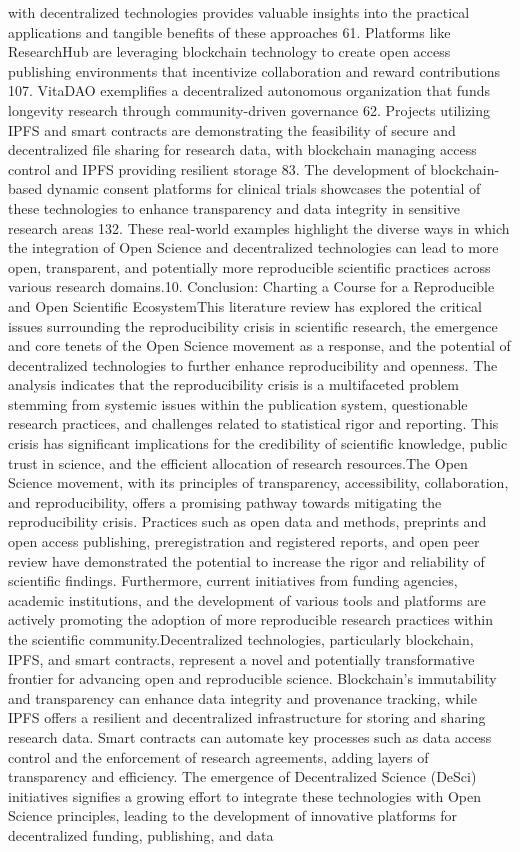 \documentclass{article}
\begin{document}
with decentralized technologies provides valuable insights into the practical applications and tangible benefits of these approaches 61. Platforms like ResearchHub are leveraging blockchain technology to create open access publishing environments that incentivize collaboration and reward contributions 107. VitaDAO exemplifies a decentralized autonomous organization that funds longevity research through community-driven governance 62. Projects utilizing IPFS and smart contracts are demonstrating the feasibility of secure and decentralized file sharing for research data, with blockchain managing access control and IPFS providing resilient storage 83. The development of blockchain-based dynamic consent platforms for clinical trials showcases the potential of these technologies to enhance transparency and data integrity in sensitive research areas 132. These real-world examples highlight the diverse ways in which the integration of Open Science and decentralized technologies can lead to more open, transparent, and potentially more reproducible scientific practices across various research domains.10. Conclusion: Charting a Course for a Reproducible and Open Scientific EcosystemThis literature review has explored the critical issues surrounding the reproducibility crisis in scientific research, the emergence and core tenets of the Open Science movement as a response, and the potential of decentralized technologies to further enhance reproducibility and openness. The analysis indicates that the reproducibility crisis is a multifaceted problem stemming from systemic issues within the publication system, questionable research practices, and challenges related to statistical rigor and reporting. This crisis has significant implications for the credibility of scientific knowledge, public trust in science, and the efficient allocation of research resources.The Open Science movement, with its principles of transparency, accessibility, collaboration, and reproducibility, offers a promising pathway towards mitigating the reproducibility crisis. Practices such as open data and methods, preprints and open access publishing, preregistration and registered reports, and open peer review have demonstrated the potential to increase the rigor and reliability of scientific findings. Furthermore, current initiatives from funding agencies, academic institutions, and the development of various tools and platforms are actively promoting the adoption of more reproducible research practices within the scientific community.Decentralized technologies, particularly blockchain, IPFS, and smart contracts, represent a novel and potentially transformative frontier for advancing open and reproducible science. Blockchain's immutability and transparency can enhance data integrity and provenance tracking, while IPFS offers a resilient and decentralized infrastructure for storing and sharing research data. Smart contracts can automate key processes such as data access control and the enforcement of research agreements, adding layers of transparency and efficiency. The emergence of Decentralized Science (DeSci) initiatives signifies a growing effort to integrate these technologies with Open Science principles, leading to the development of innovative platforms for decentralized funding, publishing, and data 
\end{document}
